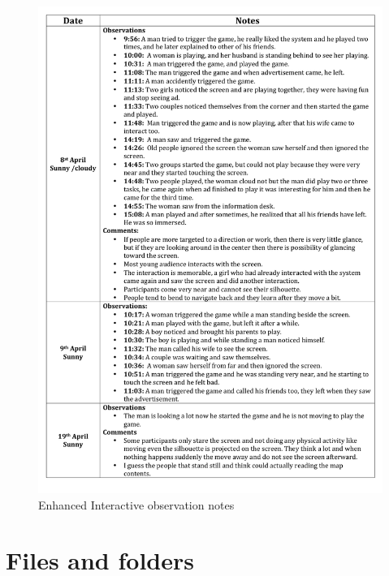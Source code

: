 \begin{appendices}
\begin{figure}[H]
 \centering 
    \includegraphics[width=\textwidth,height=0.8\textheight]{Appendices/9/Observation_notes.pdf}
    \caption{Enhanced Interactive observation notes}
     \label{app:EnhancedInteractiveobservationnotes}%
\end{figure}

\chapter{Files and folders}
\setcounter{figure}{0}
\setcounter{table}{0}


\end{appendices}
